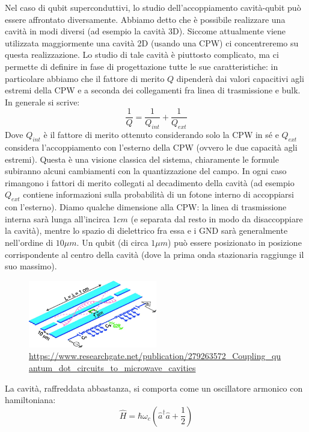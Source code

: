 Nel caso di qubit superconduttivi, lo studio dell'accoppiamento cavità-qubit può essere affrontato diversamente.
Abbiamo detto che è possibile realizzare una cavità in modi diversi (ad esempio la cavità 3D). Siccome attualmente viene utilizzata maggiormente una cavità 2D (usando una CPW) ci concentreremo su questa realizzazione. Lo studio di tale cavità è piuttosto complicato, ma ci permette di definire in fase di progettazione tutte le sue caratteristiche: in particolare abbiamo che il fattore di merito $Q$ dipenderà dai valori capacitivi agli estremi della CPW e a seconda dei collegamenti fra linea di trasmissione e bulk. In generale si scrive:
\begin{equation*}
    \frac{1}{Q}= \frac{1}{Q_{int}}+ \frac{1}{Q_{ext}}
\end{equation*}
Dove $Q_{int}$ è il fattore di merito ottenuto considerando solo la CPW in sé e $Q_{ext}$ considera l'accoppiamento con l'esterno della CPW (ovvero le due capacità agli estremi).
Questa è una visione classica del sistema, chiaramente le formule subiranno alcuni cambiamenti con la quantizzazione del campo. In ogni caso rimangono i fattori di merito collegati al decadimento della cavità (ad esempio $Q_{ext}$ contiene informazioni sulla probabilità di un fotone interno di accoppiarsi con l'esterno).
Diamo qualche dimensione alla CPW: la linea di trasmissione interna sarà lunga all'incirca $1cm$ (e separata dal resto in modo da disaccoppiare la cavità), mentre lo spazio di dielettrico fra essa e i GND sarà generalmente nell'ordine di $10\mu m$. Un qubit (di circa $1\mu m$) può essere posizionato in posizione corrispondente al centro della cavità (dove la prima onda stazionaria raggiunge il suo massimo).
\begin{figure}[H]
    \centering
    \includegraphics[width=0.5\textwidth]{images/cpw_cavity.png}
    \caption{\url{https://www.researchgate.net/publication/279263572_Coupling_quantum_dot_circuits_to_microwave_cavities}}
\end{figure}
\noindent La cavità, raffreddata abbastanza, si comporta come un oscillatore armonico con hamiltoniana:
\begin{equation*}
    \hat H= \hbar \omega_c \left( \hat a^\dagger \hat a + \frac{1}{2}\right)
\end{equation*}
